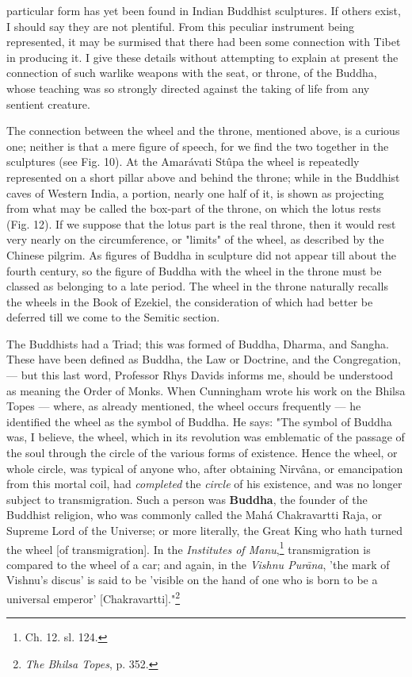 \documentclass[a4paper, 11pt, oneside, polutonikogreek, english]{article}
\begin{document}
particular form has yet been found in Indian Buddhist sculptures. If others exist, I should say they are not plentiful. From this peculiar instrument being represented, it may be surmised that there had been some connection with Tibet in producing it. I give these details without attempting to explain at present the connection of such warlike weapons with the seat, or throne, of the Buddha, whose teaching was so strongly directed against the taking of life from any sentient creature.

The connection between the wheel and the throne, mentioned above, is a curious one; neither is that a mere figure of speech, for we find the two together in the sculptures (see Fig. 10). At the Amarávati Stûpa the wheel is repeatedly represented on a short pillar above and behind the throne; while in the Buddhist caves of Western India, a portion, nearly one half of it, is shown as projecting from what may be called the box-part of the throne, on which the lotus rests (Fig. 12). If we suppose that the lotus part is the real throne, then it would rest very nearly on the circumference, or "limits" of the wheel, as described by the Chinese pilgrim. As figures of Buddha in sculpture did not appear till about the fourth century, so the figure of Buddha with the wheel in the throne must be classed as belonging to a late period. The wheel in the throne naturally recalls the wheels in the Book of Ezekiel, the consideration of which had better be deferred till we come to the Semitic section.

The Buddhists had a Triad; this was formed of Buddha, Dharma, and Sangha. These have been defined as Buddha, the Law or Doctrine, and the Congregation, --- but this last word, Professor Rhys Davids informs me, should be understood as meaning the Order of Monks. When Cunningham wrote his work on the Bhilsa Topes --- where, as already mentioned, the wheel occurs frequently --- he identified the wheel as the symbol of Buddha. He says: "The symbol of Buddha was, I believe, the wheel, which in its revolution was emblematic of the passage of the soul through the circle of the various forms of existence. Hence the wheel, or whole circle, was typical of anyone who, after obtaining Nirvâna, or emancipation from this mortal coil, had \emph{completed} the \emph{circle} of his existence, and was no longer subject to transmigration. Such a person was \textbf{Buddha}, the founder of the Buddhist religion, who was commonly called the Mahá Chakravartti Raja, or Supreme Lord of the Universe; or more literally, the Great King who hath turned the wheel [of transmigration]. In the \emph{Institutes of Manu},\footnote{Ch. 12. sl. 124.} transmigration is compared to the wheel of a car; and again, in the \emph{Vishnu Purāna}, 'the mark of Vishnu's discus' is said to be 'visible on the hand of one who is born to be a universal emperor' [Chakravartti]."\footnote{\emph{The Bhilsa Topes}, p. 352.}
\end{document}

